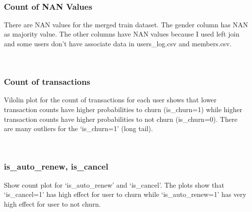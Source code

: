 \documentclass[11pt]{article}
\begin{document}
    \begin{center}
    \end{center}
    { \hspace*{\fill} \\}
    
    \subsubsection{Count of NAN Values}\label{count-of-nan-values}

There are NAN values for the merged train dataset. The gender column has
NAN as majority value. The other columns have NAN values because I used
left join and some users don't have associate data in users\_log.csv and
members.csv.

    \begin{center}
    \end{center}
    { \hspace*{\fill} \\}
    
    \subsubsection{Count of transactions}\label{count-of-transactions}

Vilolin plot for the count of transactions for each user shows that
lower transaction counts have higher probabilities to churn
(is\_churn=1) while higher transaction counts have higher probabilities
to not churn (is\_churn=0). There are many outliers for the
`is\_churn=1' (long tail).

    \begin{center}
    \end{center}
    { \hspace*{\fill} \\}
    
    \subsubsection{is\_auto\_renew,
is\_cancel}\label{isux5fautoux5frenew-isux5fcancel}

Show count plot for `is\_auto\_renew' and `is\_cancel'. The plots show
that `is\_cancel=1' has high effect for user to churn while
`is\_auto\_renew=1' has very high effect for user to not churn.
\end{document}
